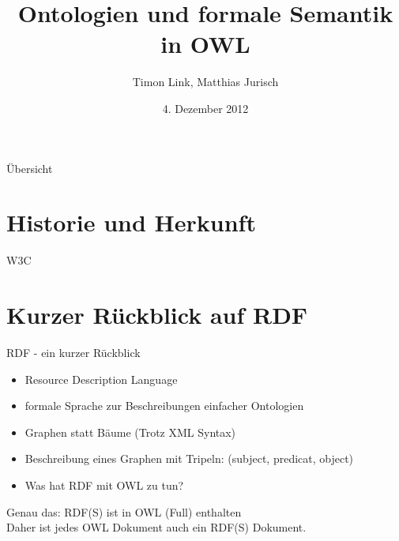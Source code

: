 \documentclass{beamer}
\title[OWL]{Ontologien und formale Semantik in OWL}
\author{Timon Link, Matthias Jurisch}
\date{4. Dezember 2012}
\begin{document}
\begin{frame}
\titlepage
\end{frame}

\begin{frame}{Übersicht}
\tableofcontents
\end{frame}

\section{Historie und Herkunft}
\begin{frame}{W3C}
\end{frame}

\section{Kurzer Rückblick auf RDF}
\begin{frame}{RDF - ein kurzer Rückblick}
\begin{itemize}
	\item \alert{R}esource \alert{D}escription \alert{L}anguage
	\item formale Sprache zur Beschreibungen einfacher Ontologien
	\item Graphen statt Bäume (Trotz XML Syntax)
	\item Beschreibung eines Graphen mit Tripeln: (subject, predicat, object)
	\item Was hat RDF mit OWL zu tun?
\end{itemize}
\begin{block}{Genau das:}
	RDF(S) ist in OWL (Full) enthalten\\
	Daher ist jedes OWL Dokument auch ein RDF(S) Dokument.
\end{block}
\end{frame}

\end{document}
